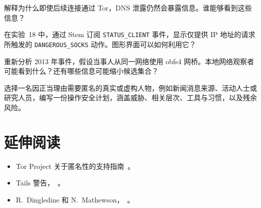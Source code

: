 \begin{esercizio}[1]\label{es:28-dns}
解释为什么即使后续连接通过 Tor，DNS 泄露仍然会暴露信息。谁能够看到这些信息？
\end{esercizio}

\begin{esercizio}[2]\label{es:28-evento}
在实验~18 中，通过 Stem 订阅 \texttt{STATUS\_CLIENT} 事件，显示仅提供 IP 地址的请求所触发的 \texttt{DANGEROUS\_SOCKS} 动作。图形界面可以如何利用它？
\end{esercizio}

\begin{esercizio}[2]\label{es:28-insieme}
重新分析 2013 年事件，假设当事人从同一网络使用 obfs4 网桥。本地网络观察者可能看到什么？还有哪些信息可能缩小候选集合？
\end{esercizio}

\begin{esercizio}[3]\label{es:28-modello}
选择一名因正当理由需要匿名的真实或虚构人物，例如新闻消息来源、活动人士或研究人员，编写一份操作安全计划，涵盖威胁、相关层次、工具与习惯，以及残余风险。
\end{esercizio}

\section*{延伸阅读}
\begin{itemize}
  \item Tor Project 关于匿名性的支持指南~\cite{torsafety}。
  \item Tails 警告，~\cite{tailswarnings}。
  \item R.~Dingledine 和 N.~Mathewson，~\cite{dingledine2006company}。
\end{itemize}
